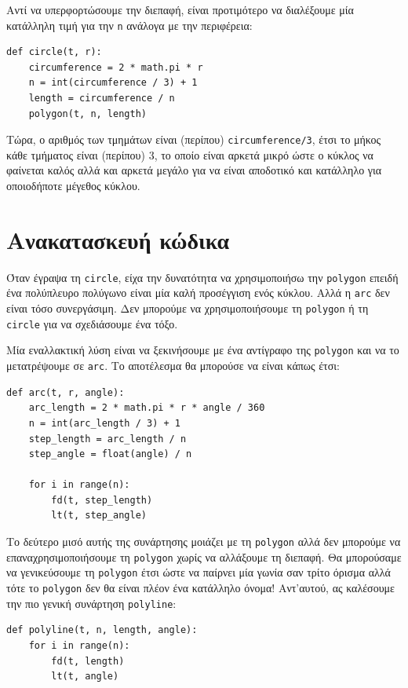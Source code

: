 \documentclass[10pt]{book}
\begin{document}
Αντί να υπερφορτώσουμε την διεπαφή, είναι προτιμότερο να διαλέξουμε μία κατάλληλη τιμή για την {\tt n} ανάλογα με την περιφέρεια:

\begin{verbatim}
def circle(t, r):
    circumference = 2 * math.pi * r
    n = int(circumference / 3) + 1
    length = circumference / n
    polygon(t, n, length)
\end{verbatim}
%

Τώρα, ο αριθμός των τμημάτων είναι (περίπου) {\tt circumference/3}, 
έτσι το μήκος κάθε τμήματος είναι (περίπου) 3, το οποίο είναι αρκετά μικρό ώστε
ο κύκλος να φαίνεται καλός αλλά και αρκετά μεγάλο για να είναι αποδοτικό και κατάλληλο για οποιοδήποτε μέγεθος κύκλου.


\section{Ανακατασκευή κώδικα}
\label{refactoring}

Όταν έγραψα τη {\tt circle}, είχα την δυνατότητα να χρησιμοποιήσω την {\tt polygon} επειδή ένα πολύπλευρο πολύγωνο είναι μία καλή προσέγγιση ενός κύκλου. Αλλά η {\tt arc} δεν είναι τόσο συνεργάσιμη. Δεν μπορούμε να χρησιμοποιήσουμε τη {\tt polygon} ή τη {\tt circle} για να σχεδιάσουμε ένα τόξο.

Μία εναλλακτική λύση είναι να ξεκινήσουμε με ένα αντίγραφο της {\tt polygon} και να το μετατρέψουμε σε {\tt arc}. Το αποτέλεσμα θα μπορούσε να είναι κάπως έτσι:

\begin{verbatim}
def arc(t, r, angle):
    arc_length = 2 * math.pi * r * angle / 360
    n = int(arc_length / 3) + 1
    step_length = arc_length / n
    step_angle = float(angle) / n

    for i in range(n):
        fd(t, step_length)
        lt(t, step_angle)
\end{verbatim}
%

Το δεύτερο μισό αυτής της συνάρτησης μοιάζει με τη {\tt polygon} αλλά
δεν μπορούμε να επαναχρησιμοποιήσουμε τη {\tt polygon} χωρίς να αλλάξουμε τη
διεπαφή. Θα μπορούσαμε να γενικεύσουμε τη {\tt polygon} έτσι ώστε να παίρνει μία γωνία σαν τρίτο όρισμα αλλά τότε το {\tt polygon} δεν θα είναι πλέον ένα κατάλληλο όνομα! Αντ'αυτού, ας καλέσουμε την πιο γενική συνάρτηση  {\tt polyline}:

\begin{verbatim}
def polyline(t, n, length, angle):
    for i in range(n):
        fd(t, length)
        lt(t, angle)
\end{verbatim}
%
\end{document}
